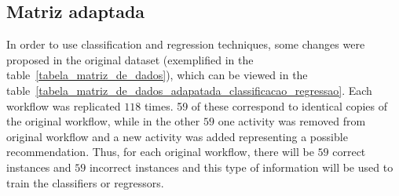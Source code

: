 \documentclass[10pt,letterpaper]{article}
\begin{document}
\subsection*{Matriz adaptada}
In order to use classification and regression techniques, some changes were proposed in the original dataset (exemplified in the table~\ref{tabela_matriz_de_dados}), which can be viewed in the table~\ref{tabela_matriz_de_dados_adapatada_classificacao_regressao}. Each workflow was replicated \(118\) times. 59 of these correspond to identical copies of the original workflow, while in the other \(59\) one activity was removed from original workflow and a new activity was added representing a possible recommendation. Thus, for each original workflow, there will be \(59\) correct instances and \(59\) incorrect instances and this type of information will be used to train the classifiers or regressors.
\end{document}

